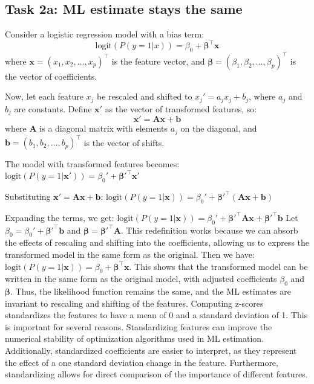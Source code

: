 \documentclass[a4paper,oneside,bibliography=totoc]{scrartcl}
\begin{document}
\subsection{Task 2a: ML estimate stays the same}

Consider a logistic regression model with a bias term:
\[
\text{logit}(P(y=1|x)) = \beta_0 + \mathbf{\beta}^\top \mathbf{x}
\]
where \( \mathbf{x} = (x_1, x_2, \ldots, x_p)^\top \) is the feature vector, and \( \mathbf{\beta} = (\beta_1, \beta_2, \ldots, \beta_p)^\top \) is the vector of coefficients. 

Now, let each feature \( x_j \) be rescaled and shifted to \( x_j' = a_j x_j + b_j \), where \( a_j \) and \( b_j \) are constants. Define \( \mathbf{x}' \) as the vector of transformed features, so:
\[
\mathbf{x}' = \mathbf{A} \mathbf{x} + \mathbf{b}
\]
where \( \mathbf{A} \) is a diagonal matrix with elements \( a_j \) on the diagonal, and \( \mathbf{b} = (b_1, b_2, \ldots, b_p)^\top \) is the vector of shifts.

The model with transformed features becomes: $
\text{logit}(P(y=1|\mathbf{x}')) = \beta_0' + \mathbf{\beta}'^\top \mathbf{x}'
$

Substituting \( \mathbf{x}' = \mathbf{A} \mathbf{x} + \mathbf{b} \): $\text{logit}(P(y=1|\mathbf{x})) = \beta_0' + \mathbf{\beta}'^\top (\mathbf{A} \mathbf{x} + \mathbf{b})$

Expanding the terms, we get: $
\text{logit}(P(y=1|\mathbf{x})) = \beta_0' + \mathbf{\beta}'^\top \mathbf{A} \mathbf{x} + \mathbf{\beta}'^\top \mathbf{b}
$
Let \( \beta_0 = \beta_0' + \mathbf{\beta}'^\top \mathbf{b} \) and \( \mathbf{\beta} = \mathbf{\beta}'^\top \mathbf{A} \). This redefinition works because we can absorb the effects of rescaling and shifting into the coefficients, allowing us to express the transformed model in the same form as the original. Then we have: $\text{logit}(P(y=1|\mathbf{x})) = \beta_0 + \mathbf{\beta}^\top \mathbf{x}$. This shows that the transformed model can be written in the same form as the original model, with adjusted coefficients \( \beta_0 \) and \( \mathbf{\beta} \). Thus, the likelihood function remains the same, and the ML estimates are invariant to rescaling and shifting of the features. Computing z-scores standardizes the features to have a mean of 0 and a standard deviation of 1. This is important for several reasons. Standardizing features can improve the numerical stability of optimization algorithms used in ML estimation. Additionally, standardized coefficients are easier to interpret, as they represent the effect of a one standard deviation change in the feature. Furthermore, standardizing allows for direct comparison of the importance of different features.
\end{document}

